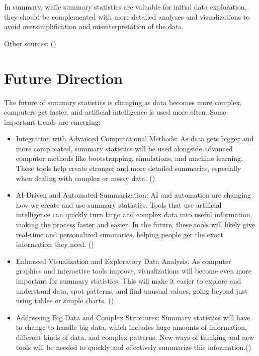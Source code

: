 \documentclass[
  man,
  floatsintext,
  longtable,
  nolmodern,
  notxfonts,
  notimes,
  colorlinks=true,linkcolor=blue,citecolor=blue,urlcolor=blue]{apa7}
\begin{document}
In summary, while summary statistics are valuable for initial data
exploration, they should be complemented with more detailed analyses and
visualizations to avoid oversimplification and misinterpretation of the
data.

Other sources: ()

\newpage

\section{Future Direction}\label{future-direction}

The future of summary statistics is changing as data becomes more
complex, computers get faster, and artificial intelligence is used more
often. Some important trends are emerging:

\begin{itemize}
\item
  Integration with Advanced Computational Methods: As data gets bigger
  and more complicated, summary statistics will be used alongside
  advanced computer methods like bootstrapping, simulations, and machine
  learning. These tools help create stronger and more detailed
  summaries, especially when dealing with complex or messy data.
  ()
\item
  AI-Driven and Automated Summarization: AI and automation are changing
  how we create and use summary statistics. Tools that use artificial
  intelligence can quickly turn large and complex data into useful
  information, making the process faster and easier. In the future,
  these tools will likely give real-time and personalized summaries,
  helping people get the exact information they need.
  ()
\item
  Enhanced Visualization and Exploratory Data Analysis: As computer
  graphics and interactive tools improve, visualizations will become
  even more important for summary statistics. This will make it easier
  to explore and understand data, spot patterns, and find unusual
  values, going beyond just using tables or simple charts.
  ()
\item
  Addressing Big Data and Complex Structures: Summary statistics will
  have to change to handle big data, which includes huge amounts of
  information, different kinds of data, and complex patterns. New ways
  of thinking and new tools will be needed to quickly and effectively
  summarize this information.()
\end{itemize}
\end{document}
